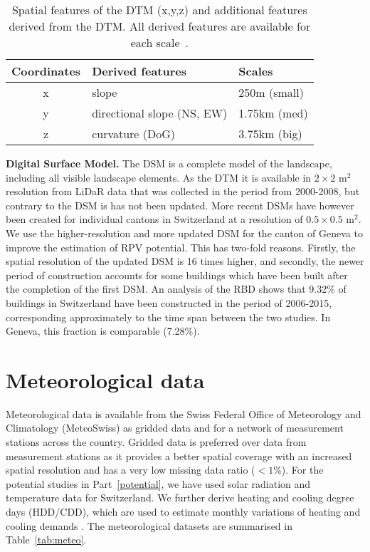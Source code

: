 \begin{table}[htb]
\centering
\footnotesize
\begin{tabular}{cll}
\hline
\textbf{Coordinates} & \textbf{Derived features} & \textbf{Scales} \\ \hline
x                    & slope                           & 250m (small)    \\
y                    & directional slope (NS, EW)      & 1.75km (med)    \\
z                    & curvature (DoG)                 & 3.75km (big)    \\ \hline
\end{tabular}
\caption{Spatial features of the DTM (x,y,z) and additional features derived from the DTM. All derived features are available for each scale~\cite{robert_spatial_2012}.}
\label{tab:DTM_ftrs}
\end{table}

\textbf{Digital Surface Model.} The DSM is a complete model of the landscape, including all visible landscape elements. As the DTM it is available  in $2\times2$ m$^2$ resolution from LiDaR data that was collected in the period from 2000-2008, but contrary to the DSM is has not been updated. More recent DSMs have however been created for individual cantons in Switzerland at a resolution of $0.5\times0.5$ m$^2$. 
%
We use the higher-resolution and more updated DSM for the canton of Geneva to improve the estimation of RPV potential.
This has two-fold reasons. Firstly, the spatial resolution of the updated DSM is 16 times higher, and secondly, the newer period of construction accounts for some buildings which have been built after the completion of the first DSM.
An analysis of the RBD shows that 9.32\% of buildings in Switzerland have been constructed in the period of 2006-2015, corresponding approximately to the time span between the two studies. In Geneva, this fraction is comparable (7.28\%).


\section{Meteorological data}
\label{data_meteo}
Meteorological data is available from the Swiss Federal Office of Meteorology and Climatology (MeteoSwiss) as gridded data and for a network of measurement stations across the country. 
Gridded data is preferred over data from measurement stations as it provides a better spatial coverage with an increased spatial resolution and has a very low missing data ratio ($<1\%$). 
For the potential studies in Part~\ref{potential}, we have used solar radiation and temperature data for Switzerland. We further derive heating and cooling degree days (HDD/CDD), which are used to estimate monthly variations of heating and cooling demands \cite{stadler_contribution_2018}. The meteorological datasets are summarised in Table~\ref{tab:meteo}.

